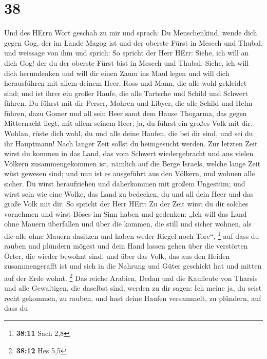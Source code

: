 \hypertarget{section-37}{%
\section{38}\label{section-37}}

 Und des HErrn Wort geschah zu mir und sprach:
 Du Menschenkind, wende dich gegen Gog, der im Lande Magog
ist und der oberste Fürst in Mesech und Thubal, und weissage von ihm
 und sprich: So spricht der Herr HErr: Siehe, ich will an
dich Gog! der du der oberste Fürst bist in Mesech und Thubal.
 Siehe, ich will dich herumlenken und will dir einen Zaum
ins Maul legen und will dich herausführen mit allem deinem Heer, Ross
und Mann, die alle wohl gekleidet sind; und ist ihrer ein großer Haufe,
die alle Tartsche und Schild und Schwert führen.  Du
führst mit dir Perser, Mohren und Libyer, die alle Schild und Helm
führen,  dazu Gomer und all sein Heer samt dem Hause
Thogarma, das gegen Mitternacht liegt, mit allem seinem Heer; ja, du
führst ein großes Volk mit dir.  Wohlan, rüste dich wohl,
du und alle deine Haufen, die bei dir sind, und sei du ihr Hauptmann!
 Nach langer Zeit sollst du heimgesucht werden. Zur
letzten Zeit wirst du kommen in das Land, das vom Schwert wiedergebracht
und aus vielen Völkern zusammengekommen ist, nämlich auf die Berge
Israels, welche lange Zeit wüst gewesen sind; und nun ist es ausgeführt
aus den Völkern, und wohnen alle sicher.  Du wirst
heraufziehen und daherkommen mit großem Ungestüm; und wirst sein wie
eine Wolke, das Land zu bedecken, du und all dein Heer und das große
Volk mit dir.  So spricht der Herr HErr: Zu der Zeit
wirst du dir solches vornehmen und wirst Böses im Sinn haben
 und gedenken: „Ich will das Land ohne Mauern überfallen
und über die kommen, die still und sicher wohnen, als die alle ohne
Mauern dasitzen und haben weder Riegel noch Tore``, \footnote{\textbf{38:11}
  Sach 2,8}  auf dass du rauben und plündern mögest und
dein Hand lassen gehen über die verstörten Örter, die wieder bewohnt
sind, und über das Volk, das aus den Heiden zusammengerafft ist und sich
in die Nahrung und Güter geschickt hat und mitten auf der Erde wohnt.
\footnote{\textbf{38:12} Hes 5,5}  Das reiche Arabien,
Dedan und die Kaufleute von Tharsis und alle Gewaltigen, die daselbst
sind, werden zu dir sagen: Ich meine ja, du seist recht gekommen, zu
rauben, und hast deine Haufen versammelt, zu plündern, auf dass du
